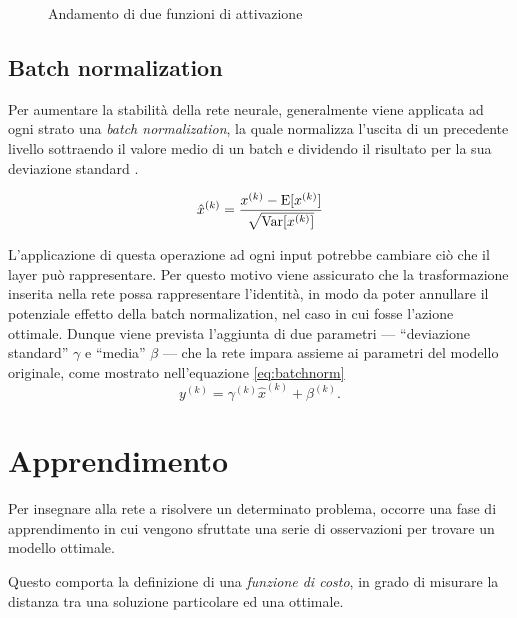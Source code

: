 \begin{figure}[htb]
	\centering
	\quad
	
	\caption{Andamento di due funzioni di attivazione}
	\label{fig:subfig}
\end{figure}


\subsection{Batch normalization}
\label{subsec:normalization}

Per aumentare la stabilità della rete neurale, generalmente viene applicata ad ogni strato una \emph{batch normalization}, la quale normalizza l'uscita di un precedente livello sottraendo il valore medio di un batch e dividendo il risultato per la sua deviazione standard \cite{ioffe2015batch}.

\begin{equation}
	\hat{x}^{(k)}=\frac{x^{(k)}-\operatorname{E}[x^{(k)}]}{\sqrt{\operatorname{Var}[x^{(k)}]}}
\end{equation}

L'applicazione di questa operazione ad ogni input potrebbe cambiare ciò che il layer può rappresentare. Per questo motivo viene assicurato che la trasformazione inserita nella rete possa rappresentare l'identità, in modo da poter annullare il potenziale effetto della batch normalization, nel caso in cui fosse l'azione ottimale.
Dunque viene prevista l'aggiunta di due parametri --- ``deviazione standard'' $\gamma$ e ``media'' $\beta$ --- che la rete impara assieme ai parametri del modello originale, come mostrato nell'equazione \ref{eq:batchnorm}
\begin{equation}
	y^{(k)}=\gamma^{(k)}\hat{x}^{(k)}+\beta^{(k)}\mbox{.}
	\label{eq:batchnorm}
\end{equation}


\section{Apprendimento}
\label{sec:apprendimento}
Per insegnare alla rete a risolvere un determinato problema, occorre una fase di apprendimento in cui vengono sfruttate una serie di osservazioni per trovare un modello ottimale.

Questo comporta la definizione di una \emph{funzione di costo}, in grado di misurare la distanza tra una soluzione particolare ed una ottimale. 

